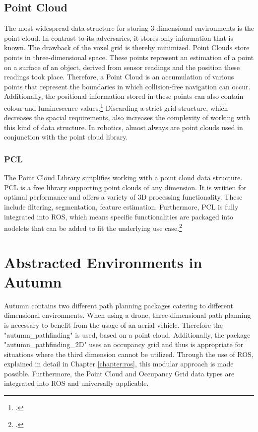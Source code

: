 \subsection{Point Cloud}
The most widespread data structure for storing 3-dimensional environments is the point cloud. In contrast to its adversaries, it stores only information that is known. The drawback of the voxel grid is thereby minimized. Point Clouds store points in three-dimensional space. These points represent an estimation of a point on a surface of an object, derived from sensor readings and the position these readings took place. Therefore, a Point Cloud is an accumulation of various points that represent the boundaries in which collision-free navigation can occur.
Additionally, the positional information stored in these points can also contain colour and luminescence values.\footcite{tech27PointCloud2018}\newline
Discarding a strict grid structure, which decreases the spacial requirements, also increases the complexity of working with this kind of data structure. In robotics, almost always are point clouds used in conjunction with the point cloud library.

\subsubsection{PCL}
The Point Cloud Library simplifies working with a point cloud data structure. PCL is a free library supporting point clouds of any dimension. It is written for optimal performance and offers a variety of 3D processing functionality. These include filtering, segmentation, feature estimation. Furthermore, PCL is fully integrated into ROS, which means specific functionalities are packaged into nodelets that can be added to fit the underlying use case.\footcite{ConselhoNacionaldeDesenvolvimentoCientificoeTecnologico1995}

\section{Abstracted Environments in Autumn}
Autumn contains two different path planning packages catering to different dimensional environments. When using a drone, three-dimensional path planning is necessary to benefit from the usage of an aerial vehicle. Therefore the "autumn\_pathfinding" is used, based on a point cloud. Additionally, the package "autumn\_pathfinding\_2D" uses an occupancy grid and thus is appropriate for situations where the third dimension cannot be utilized.\newline
Through the use of ROS, explained in detail in Chapter \ref{chapter:ros}, this modular approach is made possible. Furthermore, the Point Cloud and Occupancy Grid data types are integrated into ROS and universally applicable.   

